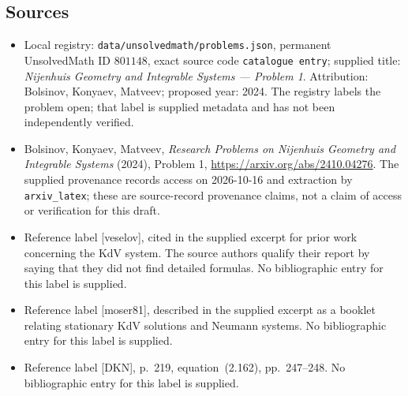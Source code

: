 \documentclass[11pt]{article}
\begin{document}
\subsection{Sources}
\begin{itemize}
\item Local registry: \texttt{data/unsolvedmath/problems.json}, permanent UnsolvedMath ID \(801148\), exact source code \texttt{catalogue entry}; supplied title: \emph{Nijenhuis Geometry and Integrable Systems --- Problem 1}. Attribution: Bolsinov, Konyaev, Matveev; proposed year: 2024. The registry labels the problem open; that label is supplied metadata and has not been independently verified.
\item Bolsinov, Konyaev, Matveev, \emph{Research Problems on Nijenhuis Geometry and Integrable Systems} (2024), Problem 1, \url{https://arxiv.org/abs/2410.04276}. The supplied provenance records access on 2026-10-16 and extraction by \texttt{arxiv\_latex}; these are source-record provenance claims, not a claim of access or verification for this draft.
\item Reference label [veselov], cited in the supplied excerpt for prior work concerning the KdV system. The source authors qualify their report by saying that they did not find detailed formulas. No bibliographic entry for this label is supplied.
\item Reference label [moser81], described in the supplied excerpt as a booklet relating stationary KdV solutions and Neumann systems. No bibliographic entry for this label is supplied.
\item Reference label [DKN], p.~219, equation~(2.162), pp.~247--248. No bibliographic entry for this label is supplied.
\end{itemize}
\end{document}
